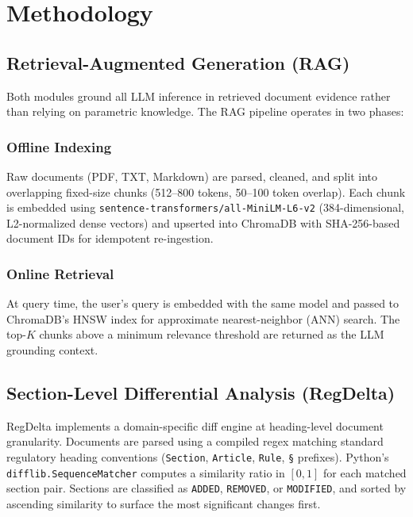 \documentclass[12pt,letterpaper]{article}
\begin{document}
\section{Methodology}

\subsection{Retrieval-Augmented Generation (RAG)}

Both modules ground all LLM inference in retrieved document evidence rather than relying on
parametric knowledge. The RAG pipeline operates in two phases:

\subsubsection*{Offline Indexing}
Raw documents (PDF, TXT, Markdown) are parsed, cleaned, and split into overlapping
fixed-size chunks (512--800 tokens, 50--100 token overlap). Each chunk is embedded using
\texttt{sentence-transformers/all-MiniLM-L6-v2} (384-dimensional, L2-normalized dense
vectors) and upserted into ChromaDB with SHA-256-based document IDs for idempotent
re-ingestion.

\subsubsection*{Online Retrieval}
At query time, the user's query is embedded with the same model and passed to ChromaDB's
HNSW index for approximate nearest-neighbor (ANN) search. The top-$K$ chunks above a
minimum relevance threshold are returned as the LLM grounding context.

\subsection{Section-Level Differential Analysis (RegDelta)}

RegDelta implements a domain-specific diff engine at heading-level document granularity.
Documents are parsed using a compiled regex matching standard regulatory heading conventions
(\texttt{Section}, \texttt{Article}, \texttt{Rule}, \texttt{\S} prefixes). Python's
\texttt{difflib.SequenceMatcher} computes a similarity ratio in $[0, 1]$ for each matched
section pair. Sections are classified as \texttt{ADDED}, \texttt{REMOVED}, or
\texttt{MODIFIED}, and sorted by ascending similarity to surface the most significant
changes first.
\end{document}
